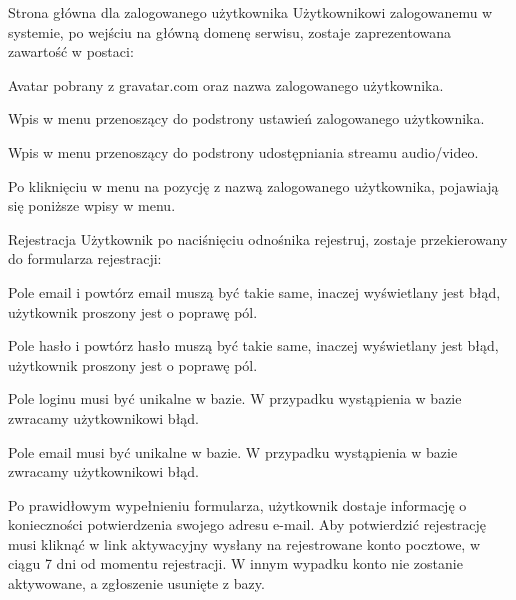 \begin{userstory}{Strona główna dla zalogowanego użytkownika}
    Użytkownikowi zalogowanemu w systemie, po wejściu na główną domenę serwisu, zostaje zaprezentowana zawartość w postaci:
    \begin{packed_enum}
        \item Avatar pobrany z gravatar.com oraz nazwa zalogowanego użytkownika.
        \item Wpis w menu przenoszący do podstrony ustawień zalogowanego użytkownika.
        \item Wpis w menu przenoszący do podstrony udostępniania streamu audio/video.
    \end{packed_enum}
    \begin{tests}
        \item{
            Po kliknięciu w menu na pozycję z nazwą zalogowanego użytkownika, pojawiają się poniższe wpisy w menu.
        }
    \end{tests}
\end{userstory}

\begin{userstory}{Rejestracja}
    Użytkownik po naciśnięciu odnośnika rejestruj,
    zostaje przekierowany do formularza rejestracji:
    \begin{tests}
        \item{
            Pole email i powtórz email muszą być takie same, inaczej wyświetlany jest błąd, użytkownik proszony jest o poprawę pól.
        }
        \item{
            Pole hasło i powtórz hasło muszą być takie same, inaczej wyświetlany jest błąd, użytkownik proszony jest o poprawę pól.
        }
        \item{
            Pole loginu musi być unikalne w bazie. W przypadku wystąpienia w bazie zwracamy użytkownikowi błąd.
        }
        \item{
            Pole email musi być unikalne w bazie. W przypadku wystąpienia w bazie zwracamy użytkownikowi błąd.
        }
        \item{
            Po prawidłowym wypełnieniu formularza, użytkownik dostaje informację o konieczności potwierdzenia swojego adresu e-mail. Aby potwierdzić rejestrację musi kliknąć w link aktywacyjny wysłany na rejestrowane konto pocztowe, w ciągu 7 dni od momentu rejestracji. W innym wypadku konto nie zostanie aktywowane, a zgłoszenie usunięte z bazy.
        }
    \end{tests}
\end{userstory}

